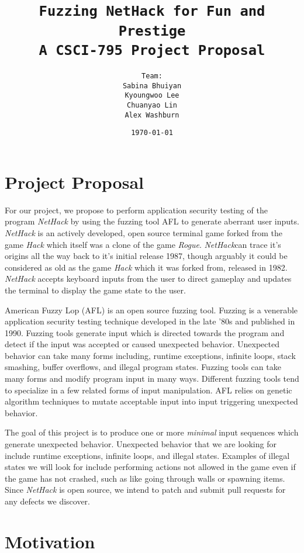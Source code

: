 \documentclass[12pt]{diazessay}
\title{\texttt{\huge{Fuzzing NetHack for Fun and Prestige} \\ {\large A CSCI-795 Project Proposal}}} %
\author{\texttt{{\Huge Team:}\\\vspace*{-0.5em} 
		Sabina Bhuiyan \\\vspace*{-0.5em} 
		Kyoungwoo Lee \\\vspace*{-0.5em}
		Chuanyao Lin \\\vspace*{-0.25em}
		Alex Washburn}} %
\date{\texttt{\today}} %
\begin{document}
\maketitle %

\section*{Project Proposal}

For our project, we propose to perform application security testing of the program \emph{NetHack} by using the fuzzing tool AFL to generate aberrant user inputs. 
\emph{NetHack} is an actively developed, open source terminal game forked from the game \emph{Hack} which itself was a clone of the game \emph{Rogue}. 
\emph{NetHack}can trace it's origins all the way back to it's initial release 1987, though arguably it could be considered as old as the game \emph{Hack} which it was forked from, released in 1982. 
\emph{NetHack} accepts keyboard inputs from the user to direct gameplay and updates the terminal to display the game state to the user.

American Fuzzy Lop (AFL) is an open source fuzzing tool.
Fuzzing is a venerable application security testing technique developed in the late '80s and published in 1990.
Fuzzing tools generate input which is directed towards the program and detect if the input was accepted or caused unexpected behavior.
Unexpected behavior can take many forms including, runtime exceptions, infinite loops, stack smashing, buffer overflows, and illegal program states.
Fuzzing tools can take many forms and modify program input in many ways.
Different fuzzing tools tend to specialize in a few related forms of input manipulation.
AFL relies on genetic algorithm techniques to mutate acceptable input into input triggering unexpected behavior.

The goal of this project is to produce one or more \emph{minimal} input sequences which generate unexpected behavior.
Unexpected behavior that we are looking for include runtime exceptions, infinite loops, and illegal states.
Examples of illegal states we will look for include performing actions not allowed in the game even if the game has not crashed, such as like going through walls or spawning items.
Since \emph{NetHack} is open source, we intend to patch and submit pull requests for any defects we discover.

\clearpage


\section*{Motivation}
\end{document}
